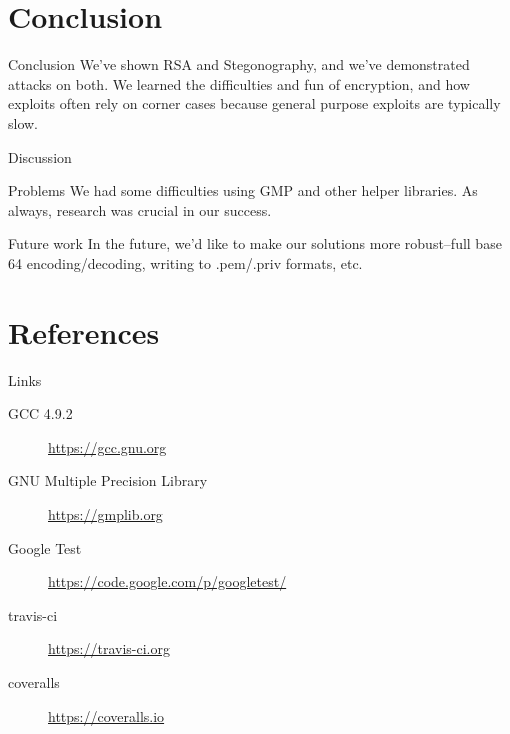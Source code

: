 \documentclass[presentation]{beamer}
\begin{document}
\section{Conclusion}
\label{sec:orgheadline1}
\begin{frame}[label=sec-4-1]{Conclusion}
We've shown RSA and Stegonography, and we've demonstrated attacks on both. We learned 
the difficulties and fun of encryption, and how exploits often rely on corner cases because 
general purpose exploits are typically slow.
\end{frame}
\begin{frame}[label=sec-4-2]{Discussion}
\begin{block}{Problems}
We had some difficulties using GMP and other helper libraries. As always, research was
crucial in our success. 
\end{block}

\begin{block}{Future work}
In the future, we'd like to make our solutions more robust--full base 64
encoding/decoding, writing to .pem/.priv formats, etc.
\end{block}
\end{frame}
\section{References}
\label{sec:orgheadline1}
\begin{frame}[label=sec-5-1]{Links}
\begin{description}
\item[{GCC 4.9.2}] \url{https://gcc.gnu.org}
\item[{GNU Multiple Precision Library}] \url{https://gmplib.org}
\item[{Google Test}] \url{https://code.google.com/p/googletest/}
\item[{travis-ci}] \url{https://travis-ci.org}
\item[{coveralls}] \url{https://coveralls.io}
\end{description}
\end{frame}
\end{document}
